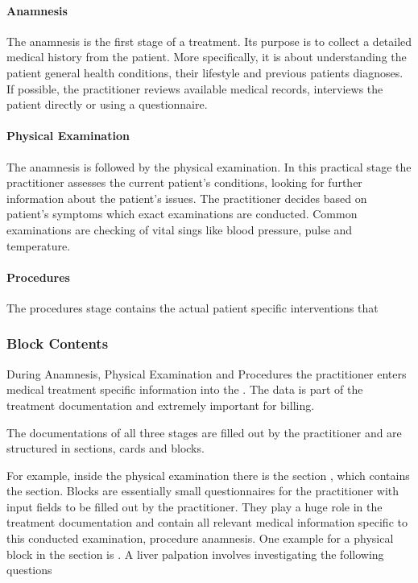\paragraph{Anamnesis}
The anamnesis is the first stage of a treatment.
Its purpose is to collect a detailed medical history from the patient\cite{lino2021medical}.
More specifically, it is about understanding the patient general health conditions, their lifestyle and previous patients diagnoses.
If possible, the practitioner reviews available medical records, interviews the patient directly or using a questionnaire\cite{zhang2011anamnevis}.


\paragraph{Physical Examination}
The anamnesis is followed by the physical examination.
In this practical stage the practitioner assesses the current patient's conditions, looking for further information about the patient's issues\cite{seidel2010mosby}.
The practitioner decides based on patient's symptoms which exact examinations are conducted.
Common examinations are checking of vital sings like blood pressure, pulse and temperature.

\paragraph{Procedures}
The procedures stage contains the actual patient specific interventions that



\subsubsection{Block Contents}
During Anamnesis, Physical Examination and Procedures the practitioner enters medical treatment specific information into the \AVS.
The data is part of the treatment documentation and extremely important for billing.

The documentations of all three stages are filled out by the practitioner and are structured in sections, cards and blocks.

For example, inside the physical examination there is the section , which contains the  section.
Blocks are essentially small questionnaires for the practitioner with input fields to be filled out by the practitioner.
They play a huge role in the treatment documentation and contain all relevant medical information specific to this conducted examination, procedure anamnesis.
One example for a physical block in the  section is .
A liver palpation involves investigating the following questions


